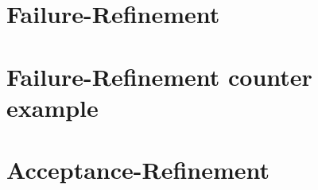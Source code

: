 


\section{Failure-Refinement}
\label{sec_failure-refinement}


\section{Failure-Refinement counter example}
\label{sec_failure_refinement_application}


\section{Acceptance-Refinement}
\label{sec_acceptance-refinement}
